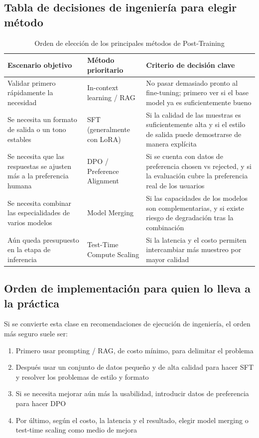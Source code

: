 \subsection{Tabla de decisiones de ingeniería para elegir método}

\begin{table}[H]
\centering
\begin{tabular}{p{} p{} p{}}
\toprule
Escenario objetivo & Método prioritario & Criterio de decisión clave \\
\midrule
Validar primero rápidamente la necesidad & In-context learning / RAG & No pasar demasiado pronto al fine-tuning; primero ver si el base model ya es suficientemente bueno \\
Se necesita un formato de salida o un tono estables & SFT (generalmente con LoRA) & Si la calidad de las muestras es suficientemente alta y si el estilo de salida puede demostrarse de manera explícita \\
Se necesita que las respuestas se ajusten más a la preferencia humana & DPO / Preference Alignment & Si se cuenta con datos de preferencia chosen vs rejected, y si la evaluación cubre la preferencia real de los usuarios \\
Se necesita combinar las especialidades de varios modelos & Model Merging & Si las capacidades de los modelos son complementarias, y si existe riesgo de degradación tras la combinación \\
Aún queda presupuesto en la etapa de inferencia & Test-Time Compute Scaling & Si la latencia y el costo permiten intercambiar más muestreo por mayor calidad \\
\bottomrule
\end{tabular}
\caption{Orden de elección de los principales métodos de Post-Training}
\end{table}

\subsection{Orden de implementación para quien lo lleva a la práctica}

Si se convierte esta clase en recomendaciones de ejecución de ingeniería, el orden más seguro suele ser:

\begin{enumerate}
    \item Primero usar prompting / RAG, de costo mínimo, para delimitar el problema
    \item Después usar un conjunto de datos pequeño y de alta calidad para hacer SFT y resolver los problemas de estilo y formato
    \item Si se necesita mejorar aún más la usabilidad, introducir datos de preferencia para hacer DPO
    \item Por último, según el costo, la latencia y el resultado, elegir model merging o test-time scaling como medio de mejora
\end{enumerate}

